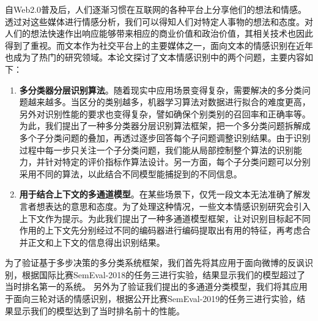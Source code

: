 \begin{cabstract}

自Web2.0普及后，人们逐渐习惯在互联网的各种平台上分享他们的想法和情感。透过对这些媒体进行情感分析，我们可以得知人们对特定人事物的想法和态度。对人们的想法快速作出响应能够带来相应的商业价值和政治价值，其相关技术也因此得到了重视。而文本作为社交平台上的主要媒体之一，面向文本的情感识别在近年也成为了热门的研究领域。本论文探讨了文本情感识别中的两个问题，主要内容如下：

\begin{enumerate}

\item {\bf 多分类器分层识别算法}。随着现实中应用场景变得复杂，需要解决的多分类问题越来越多。当区分的类别越多，机器学习算法对数据进行拟合的难度更高，另外对识别性能的要求也变得复杂，譬如确保个别类别的召回率和正确率等。为此，我们提出了一种多分类器分层识别算法框架，把一个多分类问题拆解成多个子分类问题的叠加，再透过逐步回答每个子问题调整识别结果。由于识别过程中每一步只关注一个子分类问题，我们能从局部控制整个算法的识别能力，并针对特定的评价指标作算法设计。另一方面，每个子分类问题可以分别采用不同的算法，以此结合不同模型能捕捉到的不同信息。

\item {\bf 用于结合上下文的多通道模型}。在某些场景下，仅凭一段文本无法准确了解发言者想表达的意思和态度。为了处理这种情况，一些文本情感识别研究会引入上下文作为提示。为此我们提出了一种多通道模型框架，让对识别目标起不同作用的上下文先分别经过不同的编码器进行编码提取出有用的特征，再考虑合并正文和上下文的信息得出识别结果。

\end{enumerate}

为了验证基于多步决策的多分类系统框架，我们首先将其应用于面向微博的反讽识别，根据国际比赛SemEval-2018的任务三进行实验，结果显示我们的模型超过了当时排名第一的系统。
另外为了验证我们提出的多通道分类模型，我们将其应用于面向三轮对话的情感识别，根据公开比赛SemEval-2019的任务三进行实验，结果显示我们的模型达到了当时排名前十的性能。


\end{cabstract}


